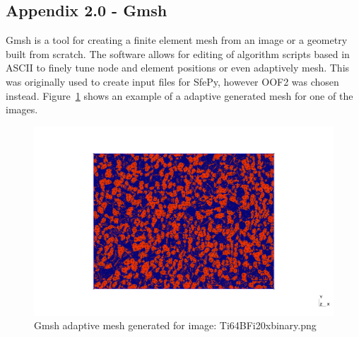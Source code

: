 \documentclass[\report.tex]{subfiles}
\begin{document}
\subsection{Appendix 2.0 - Gmsh}
Gmsh is a tool for creating a finite element mesh from an image or a geometry built from scratch. The software allows for editing of algorithm scripts based in ASCII to finely tune node and element positions or even adaptively mesh. This was originally used to create input files for SfePy, however OOF2 was chosen instead. Figure~\ref{fig:gmsh} shows an example of a adaptive generated mesh for one of the images.

\begin{figure}[h!]
    \centering
    \includegraphics[width=14cm]{Images/out.png}
    \caption{Gmsh adaptive mesh generated for image: Ti64BFi20xbinary.png}
    \label{fig:gmsh}
\end{figure}
\end{document}
